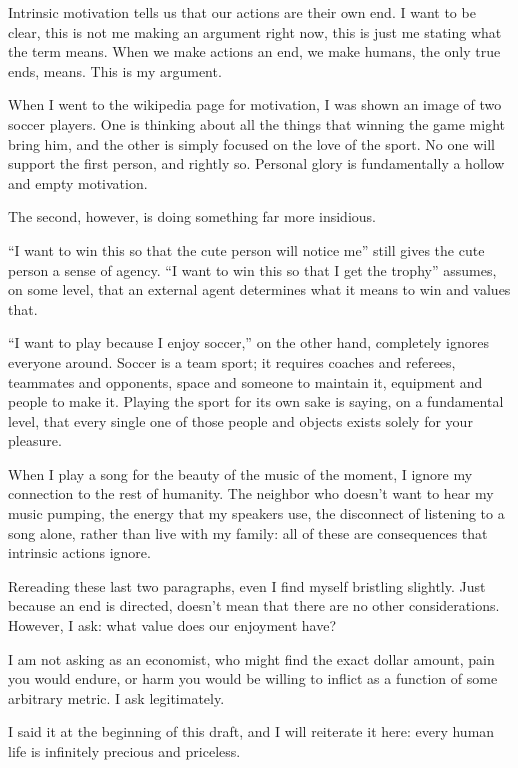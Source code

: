 \documentclass[12pt]{article}
\newcommand{\say}[1]{``#1''}
\renewcommand{\,}{\textsuperscript{,}}
\begin{document}
Intrinsic motivation tells us that our actions are their own end.  
I want to be clear, this is not me making an argument right now, this is just me stating what the term means.  
When we make actions an end, we make humans, the only true ends, means.  
This is my argument.

When I went to the wikipedia page for motivation, I was shown an image of two soccer players.  
One is thinking about all the things that winning the game might bring him, and the other is simply focused on the love of the sport.  
No one will support the first person, and rightly so.  
Personal glory is fundamentally a hollow and empty motivation.

The second, however, is doing something far more insidious.

\say{I want to win this so that the cute person will notice me} still gives the cute person a sense of agency.  
\say{I want to win this so that I get the trophy} assumes, on some level, that an external agent determines what it means to win and values that.

\say{I want to play because I enjoy soccer,} on the other hand, completely ignores everyone around.  
Soccer is a team sport; it requires coaches and referees, teammates and opponents, space and someone to maintain it, equipment and people to make it.  
Playing the sport for its own sake is saying, on a fundamental level, that every single one of those people and objects exists solely for your pleasure.

When I play a song for the beauty of the music of the moment, I ignore my connection to the rest of humanity.  
The neighbor who doesn't want to hear my music pumping, the energy that my speakers use, the disconnect of listening to a song alone, rather than live with my family: all of these are consequences that intrinsic actions ignore.

Rereading these last two paragraphs, even I find myself bristling slightly.  
Just because an end is directed, doesn't mean that there are no other considerations.  
However, I ask: what value does our enjoyment have?

I am not asking as an economist, who might find the exact dollar amount, pain you would endure, or harm you would be willing to inflict as a function of some arbitrary metric.  
I ask legitimately.

I said it at the beginning of this draft, and I will reiterate it here: every human life is infinitely precious and priceless.
\end{document}
